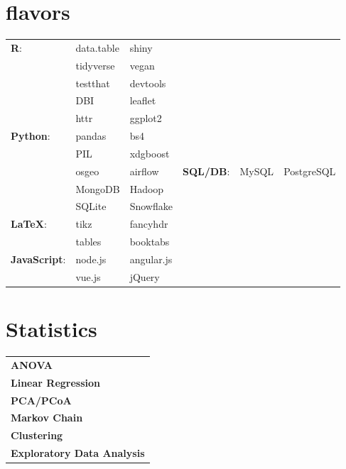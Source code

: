 \documentclass[10pt]{article}%
\begin{document}
\begin{minipage}[ht]{.25\linewidth}
   \section*{\faCubes{} flavors}%
   \flushright%
   {\small
      \begin{tabularx}{\linewidth}{p{.24\linewidth}XX}
         \textbf{R}: & data.table & shiny \\
                     & tidyverse  & vegan \\
                     & testthat   & devtools \\
                     & DBI        & leaflet \\
                     & httr       & ggplot2 \\
         \textbf{Python}: & pandas & bs4 \\
                          & PIL    & xdgboost \\
                          & osgeo  & airflow & 
         \textbf{SQL/DB}: & MySQL & PostgreSQL \\
                       & MongoDB & Hadoop \\
                       & SQLite  & Snowflake \\
         \textbf{\LaTeX}:  & tikz   & fancyhdr \\
                           & tables & booktabs \\
         \textbf{JavaScript}: & node.js & angular.js \\
                              & vue.js & jQuery
     \end{tabularx}
     }
     \flushleft%
   \section*{\faBarChart{} Statistics}%
   \flushright%
   {\small
      \begin{tabularx}{\linewidth}{X}
        \textbf{ANOVA} \\
        \textbf{Linear Regression} \\
        \textbf{PCA/PCoA} \\
        \textbf{Markov Chain} \\
        \textbf{Clustering} \\
        \textbf{Exploratory Data Analysis}
      \end{tabularx}}
      \flushleft%
\end{minipage}%
\end{document}

